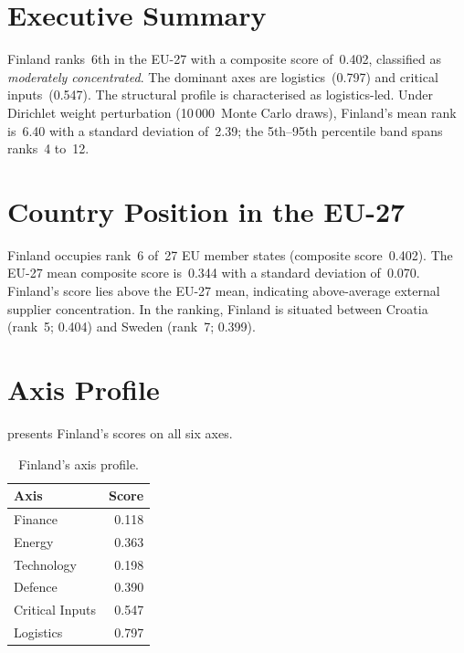 \documentclass[12pt,a4paper]{article}
\begin{document}
\hypersetup{pageanchor=true}
\pagestyle{fancy}
\renewcommand{\headrulewidth}{0.4pt}


\section{Executive Summary}
\label{sec:summary}

Finland ranks~6th in the EU-27 with a composite \ISI score of~0.402, classified as \emph{moderately concentrated}.  The dominant axes are logistics~(0.797) and critical inputs~(0.547).  The structural profile is characterised as logistics-led.  Under Dirichlet weight perturbation (10\,000~Monte Carlo draws), Finland's mean rank is~6.40 with a standard deviation of~2.39; the 5th--95th percentile band spans ranks~4 to~12.


\section{Country Position in the EU-27}
\label{sec:position}

Finland occupies rank~6 of~27 EU member states (composite score~0.402).  The EU-27 mean composite score is~0.344 with a standard deviation of~0.070.  Finland's score lies above the EU-27 mean, indicating above-average external supplier concentration.  In the ranking, Finland is situated between Croatia (rank~5; 0.404) and Sweden (rank~7; 0.399).


\section{Axis Profile}
\label{sec:axis-profile}

 presents Finland's scores on all six \ISI axes.

\begin{table}[htbp]
\centering\small
\caption{Finland's \ISI axis profile.}
\label{tab:axis-profile}
\begin{tabular}{@{}lr@{}}
\toprule
\textbf{Axis} & \textbf{Score} \\
\midrule
    Finance           & 0.118 \\
    Energy            & 0.363 \\
    Technology        & 0.198 \\
    Defence           & 0.390 \\
    Critical Inputs   & 0.547 \\
    Logistics         & 0.797 \\
\bottomrule
\end{tabular}
\end{table}
\end{document}
